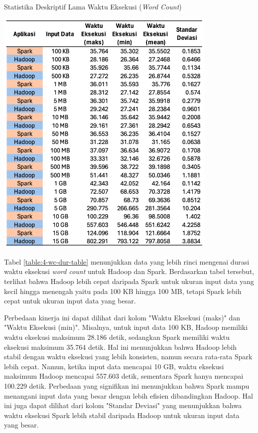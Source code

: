 \begin{table}[h]
  \centering
  \caption{Statistika Deskriptif Lama Waktu Eksekusi (\textit{Word Count})}
  \includegraphics[width=0.8\textwidth]{figures/ch04/4-wc-dur-table}
  \label{table:4-wc-dur-table}
\end{table}

Tabel \ref{table:4-wc-dur-table} menunjukkan data yang lebih rinci mengenai durasi waktu eksekusi \textit{word count} untuk Hadoop dan Spark. Berdasarkan tabel tersebut, terlihat bahwa Hadoop lebih cepat daripada Spark untuk ukuran input data yang kecil hingga menengah yaitu pada 100 KB hingga 100 MB, tetapi Spark lebih cepat untuk ukuran input data yang besar.

Perbedaan kinerja ini dapat dilihat dari kolom "Waktu Eksekusi (maks)" dan "Waktu Eksekusi (min)". Misalnya, untuk input data 100 KB, Hadoop memiliki waktu eksekusi maksimum 28.186 detik, sedangkan Spark memiliki waktu eksekusi maksimum 35.764 detik. Hal ini menunjukkan bahwa Hadoop lebih stabil dengan waktu eksekusi yang lebih konsisten, namun secara rata-rata Spark lebih cepat. Namun, ketika input data mencapai 10 GB, waktu eksekusi maksimum Hadoop mencapai 557.603 detik, sementara Spark hanya mencapai 100.229 detik. Perbedaan yang signifikan ini menunjukkan bahwa Spark mampu menangani input data yang besar dengan lebih efisien dibandingkan Hadoop. Hal ini juga dapat dilihat dari kolom "Standar Deviasi" yang menunjukkan bahwa waktu eksekusi Spark lebih stabil daripada Hadoop untuk ukuran input data yang besar.

